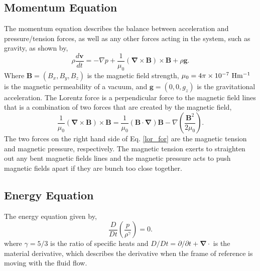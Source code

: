 \documentclass[12pt]{ociamthesis}
\newcommand{\bs}[1]{\boldsymbol{#1}}
\newcommand{\bn}{\boldsymbol{\nabla}}
\newcommand{\eref}[1]{Eq. \eqref{#1}}
\begin{document}
\subsection{Momentum Equation}
\label{section:cont_eq}
The momentum equation describes the balance between acceleration and pressure/tension forces, as well as any other forces acting in the system, such as gravity, as shown by,
\begin{equation}\label{eq87}
\rho \frac{d \boldsymbol{v}}{dt} = - \nabla p + \frac{1}{\mu_0} (\bn \times \boldsymbol{B}) \times \boldsymbol{B} + \rho \boldsymbol{g}.
\end{equation}
Where $\bs{B}=(B_x,B_y,B_z)$ is the magnetic field strength, $\mu_0=4 \pi \times 10^{-7}~\rm{Hm^{-1}}$ is the magnetic permeability of a vacuum, and $\bs{g} = (0,0,g_z)$ is the gravitational acceleration. The Lorentz force is a perpendicular force to the magnetic field lines that is a combination of two forces that are created by the magnetic field,
\begin{equation}\label{lor_for} 
    \frac{1}{\mu_0}(\bs{\nabla}\times \bs{B})\times \bs{B} = \frac{1}{\mu_0}( \bs{B} \cdot \bs{\nabla}) \bs{B} - \nabla\left(\frac{ \bs{B}^2}{2\mu_0}\right).
\end{equation}
The two forces on the right hand side of \eref{lor_for} are the magnetic tension and magnetic pressure, respectively. The magnetic tension exerts to straighten out any bent magnetic fields lines and the magnetic pressure acts to push magnetic fields apart if they are bunch too close together.    %
\subsection{Energy Equation}
\label{section:cont_eq}
The energy equation given by, 
\begin{equation}\label{eq88}
\frac{D}{D t} \left( \frac{p}{\rho^{\gamma}} \right) = 0.
\end{equation}
where $\gamma=5/3$ is the ratio of specific heats and $D/Dt = \partial/\partial t+\bn \cdot$ is the material derivative, which describes the derivative when the frame of reference is moving with the fluid flow.
\end{document}
